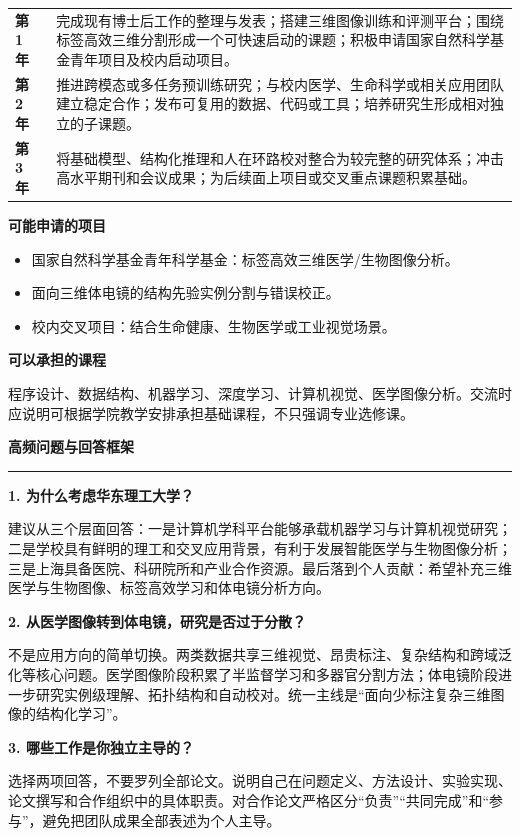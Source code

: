 \documentclass[11pt,a4paper]{ctexart}
\newcommand{\sectionbar}[1]{%
  \vspace{0.35em}
  {\large\bfseries\sffamily\color{accent} #1}\par
  \vspace{-0.35em}\color{accent}\rule{\textwidth}{0.7pt}\color{black}\vspace{0.2em}
}
\newcommand{\prompt}[1]{\textbf{\color{accent}#1}}
\begin{document}
\begin{tabularx}{\textwidth}{>{\bfseries}p{1.8cm} X}
第 1 年 & 完成现有博士后工作的整理与发表；搭建三维图像训练和评测平台；围绕标签高效三维分割形成一个可快速启动的课题；积极申请国家自然科学基金青年项目及校内启动项目。\\
第 2 年 & 推进跨模态或多任务预训练研究；与校内医学、生命科学或相关应用团队建立稳定合作；发布可复用的数据、代码或工具；培养研究生形成相对独立的子课题。\\
第 3 年 & 将基础模型、结构化推理和人在环路校对整合为较完整的研究体系；冲击高水平期刊和会议成果；为后续面上项目或交叉重点课题积累基础。\\
\end{tabularx}

\prompt{可能申请的项目}
\begin{itemize}
  \item 国家自然科学基金青年科学基金：标签高效三维医学/生物图像分析。
  \item 面向三维体电镜的结构先验实例分割与错误校正。
  \item 校内交叉项目：结合生命健康、生物医学或工业视觉场景。
\end{itemize}

\prompt{可以承担的课程}

程序设计、数据结构、机器学习、深度学习、计算机视觉、医学图像分析。交流时应说明可根据学院教学安排承担基础课程，不只强调专业选修课。

\newpage
\sectionbar{高频问题与回答框架}

\begingroup
\small

\prompt{1. 为什么考虑华东理工大学？}

建议从三个层面回答：一是计算机学科平台能够承载机器学习与计算机视觉研究；二是学校具有鲜明的理工和交叉应用背景，有利于发展智能医学与生物图像分析；三是上海具备医院、科研院所和产业合作资源。最后落到个人贡献：希望补充三维医学与生物图像、标签高效学习和体电镜分析方向。

\prompt{2. 从医学图像转到体电镜，研究是否过于分散？}

不是应用方向的简单切换。两类数据共享三维视觉、昂贵标注、复杂结构和跨域泛化等核心问题。医学图像阶段积累了半监督学习和多器官分割方法；体电镜阶段进一步研究实例级理解、拓扑结构和自动校对。统一主线是“面向少标注复杂三维图像的结构化学习”。

\prompt{3. 哪些工作是你独立主导的？}

选择两项回答，不要罗列全部论文。说明自己在问题定义、方法设计、实验实现、论文撰写和合作组织中的具体职责。对合作论文严格区分“负责”“共同完成”和“参与”，避免把团队成果全部表述为个人主导。
\end{document}
